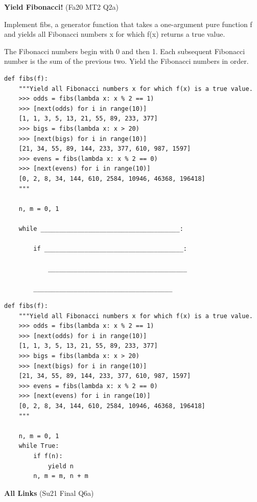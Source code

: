 \documentclass{exam}
\newlength{\currentparskip}
\newenvironment{blocksection}
{
    \setlength{\currentparskip}{\parskip}%
    \begin{minipage}{\linewidth}
    \setlength{\parskip}{\currentparskip}%
}
{
    \end{minipage}
}
\begin{document}
\begin{questions}
    
\begin{blocksection}
\question \textbf{Yield Fibonacci!} (Fa20 MT2 Q2a)

    Implement fibs, a generator function that takes a one-argument pure function f and yields all Fibonacci numbers x for which f(x) returns a true value.
    
    The Fibonacci numbers begin with 0 and then 1. Each subsequent Fibonacci number is the sum of the previous two. Yield the Fibonacci numbers in order.
\begin{lstlisting}
def fibs(f):
    """Yield all Fibonacci numbers x for which f(x) is a true value.
    >>> odds = fibs(lambda x: x % 2 == 1)
    >>> [next(odds) for i in range(10)]
    [1, 1, 3, 5, 13, 21, 55, 89, 233, 377]
    >>> bigs = fibs(lambda x: x > 20)
    >>> [next(bigs) for i in range(10)]
    [21, 34, 55, 89, 144, 233, 377, 610, 987, 1597]
    >>> evens = fibs(lambda x: x % 2 == 0)
    >>> [next(evens) for i in range(10)]
    [0, 2, 8, 34, 144, 610, 2584, 10946, 46368, 196418]
    """
    
    n, m = 0, 1

    while ______________________________________:

        if ______________________________________:

            ______________________________________

        ______________________________________
\end{lstlisting}
\end{blocksection}
\begin{solution}
\begin{lstlisting}
def fibs(f):
    """Yield all Fibonacci numbers x for which f(x) is a true value.
    >>> odds = fibs(lambda x: x % 2 == 1)
    >>> [next(odds) for i in range(10)]
    [1, 1, 3, 5, 13, 21, 55, 89, 233, 377]
    >>> bigs = fibs(lambda x: x > 20)
    >>> [next(bigs) for i in range(10)]
    [21, 34, 55, 89, 144, 233, 377, 610, 987, 1597]
    >>> evens = fibs(lambda x: x % 2 == 0)
    >>> [next(evens) for i in range(10)]
    [0, 2, 8, 34, 144, 610, 2584, 10946, 46368, 196418]
    """
    
    n, m = 0, 1
    while True:
        if f(n):
            yield n
        n, m = m, n + m
\end{lstlisting}
\end{solution}


\begin{blocksection}
\question \textbf{All Links} (Su21 Final Q6a)


\end{blocksection}
\end{questions}
\end{document}
